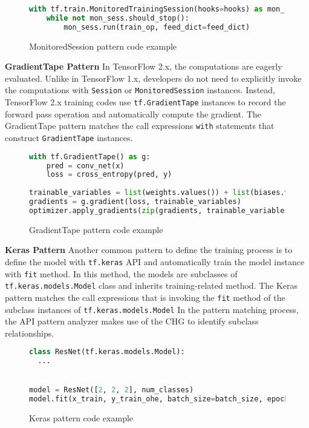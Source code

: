 \begin{figure}
  \begin{lstlisting}[language=Python]
with tf.train.MonitoredTrainingSession(hooks=hooks) as mon_sess:
    while not mon_sess.should_stop():
        mon_sess.run(train_op, feed_dict=feed_dict)
  \end{lstlisting}
  \caption{MonitoredSession pattern code example}
\end{figure}

\textbf{GradientTape Pattern}
In TensorFlow 2.x, the computations are eagerly evaluated.
Unlike in TensorFlow 1.x, developers do not need to explicitly invoke the computations
with {\tt Session} or {\tt MonitoredSession} instances.
Instead, TensorFlow 2.x training codes use {\tt tf.GradientTape} instances
to record the forward pass operation and automatically compute the gradient.
The GradientTape pattern matches the call expressions {\tt with} statements
that construct {\tt GradientTape} instances.

\begin{figure}
  \begin{lstlisting}[language=Python]
with tf.GradientTape() as g:
    pred = conv_net(x)
    loss = cross_entropy(pred, y)
    
trainable_variables = list(weights.values()) + list(biases.values())
gradients = g.gradient(loss, trainable_variables)
optimizer.apply_gradients(zip(gradients, trainable_variables))
  \end{lstlisting}
  \caption{GradientTape pattern code example}
\end{figure}

\textbf{Keras Pattern}
Another common pattern to define the training process is to define
the model with {\tt tf.keras} API and automatically train the model
instance with {\tt fit} method.
In this method, the models are subclasses of {\tt tf.keras.models.Model} class
and inherits training-related method.
The Keras pattern matches the call expressions that is invoking the {\tt fit}
method of the subclass instances of {\tt tf.keras.models.Model}
In the pattern matching process, the API pattern analyzer
makes use of the CHG to identify subclass relationships. 

\begin{figure}
  \begin{lstlisting}[language=Python]
class ResNet(tf.keras.models.Model):
  ...


model = ResNet([2, 2, 2], num_classes)
model.fit(x_train, y_train_ohe, batch_size=batch_size, epochs=epochs,
  \end{lstlisting}
  \caption{Keras pattern code example}
\end{figure}


